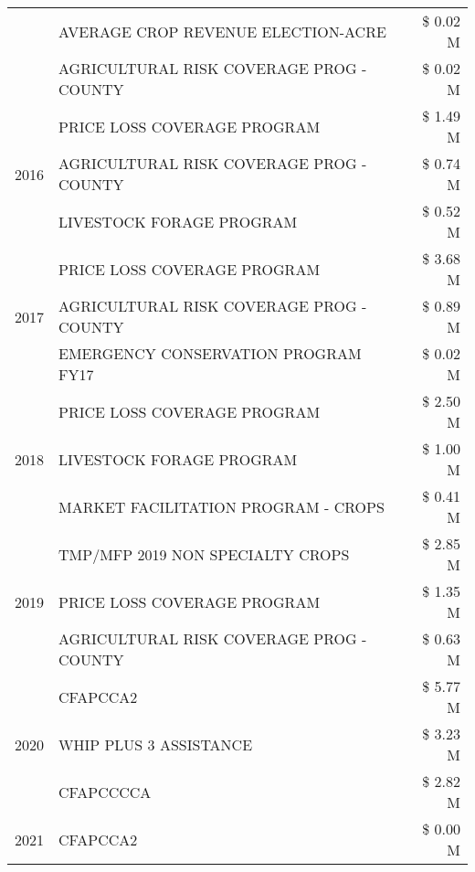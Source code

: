 \begin{tabular}{llr}
 & AVERAGE CROP REVENUE ELECTION-ACRE & \$ 0.02 M \\
 & AGRICULTURAL RISK COVERAGE PROG - COUNTY & \$ 0.02 M \\
\cline{1-3}
\multirow[t]{3}{*}{2016} & PRICE LOSS COVERAGE PROGRAM & \$ 1.49 M \\
 & AGRICULTURAL RISK COVERAGE PROG - COUNTY & \$ 0.74 M \\
 & LIVESTOCK FORAGE PROGRAM & \$ 0.52 M \\
\cline{1-3}
\multirow[t]{3}{*}{2017} & PRICE LOSS COVERAGE PROGRAM & \$ 3.68 M \\
 & AGRICULTURAL RISK COVERAGE PROG - COUNTY & \$ 0.89 M \\
 & EMERGENCY CONSERVATION PROGRAM FY17 & \$ 0.02 M \\
\cline{1-3}
\multirow[t]{3}{*}{2018} & PRICE LOSS COVERAGE PROGRAM & \$ 2.50 M \\
 & LIVESTOCK FORAGE PROGRAM & \$ 1.00 M \\
 & MARKET FACILITATION PROGRAM - CROPS & \$ 0.41 M \\
\cline{1-3}
\multirow[t]{3}{*}{2019} & TMP/MFP 2019 NON SPECIALTY CROPS & \$ 2.85 M \\
 & PRICE LOSS COVERAGE PROGRAM & \$ 1.35 M \\
 & AGRICULTURAL RISK COVERAGE PROG - COUNTY & \$ 0.63 M \\
\cline{1-3}
\multirow[t]{3}{*}{2020} & CFAPCCA2 & \$ 5.77 M \\
 & WHIP PLUS 3 ASSISTANCE & \$ 3.23 M \\
 & CFAPCCCCA & \$ 2.82 M \\
\cline{1-3}
2021 & CFAPCCA2 & \$ 0.00 M \\
\cline{1-3}
\bottomrule
\end{tabular}
